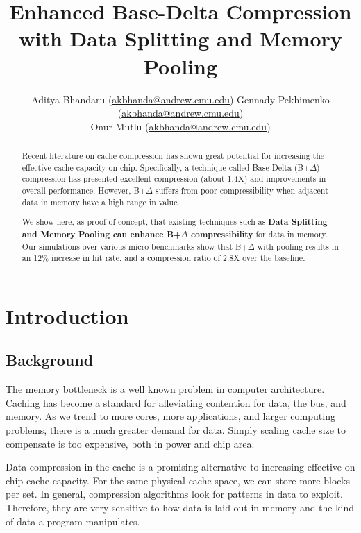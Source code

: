 \documentclass[pageno]{jpaper}
\begin{document}
\title{Enhanced Base-Delta Compression with Data Splitting and Memory Pooling}
\author{Aditya Bhandaru (\href{mailto:akbhanda@andrew.cmu.edu}{akbhanda@andrew.cmu.edu}) Gennady Pekhimenko (\href{mailto:gpekhime@cs.cmu.edu}{akbhanda@andrew.cmu.edu}) \\
Onur Mutlu (\href{mailto:onur@cmu.edu}{akbhanda@andrew.cmu.edu})}
\date{}
\maketitle

\thispagestyle{empty}

\begin{abstract}
Recent literature on cache compression has shown great potential for increasing the effective cache capacity on chip. Specifically, a technique called Base-Delta (B+$\Delta$) compression has presented excellent compression (about 1.4X) and improvements in overall performance. However, B+$\Delta$ suffers from poor compressibility when adjacent data in memory have a high range in value.

We show here, as proof of concept, that existing techniques such as \textbf{Data Splitting and Memory Pooling can enhance B+$\Delta$ compressibility} for data in memory. Our simulations over various micro-benchmarks show that B+$\Delta$ with pooling  results in an 12\% increase in hit rate, and a compression ratio of 2.8X over the baseline.
\end{abstract}

\section{Introduction}

\subsection{Background}

The memory bottleneck is a well known problem in computer architecture. Caching has become a standard for alleviating contention for data, the bus, and memory. As we trend to more cores, more applications, and larger computing problems, there is a much greater demand for data. Simply scaling cache size to compensate is too expensive, both in power and chip area.

Data compression in the cache is a promising alternative to increasing effective on chip cache capacity. For the same physical cache space, we can store more blocks per set. In general, compression algorithms look for patterns in data to exploit. Therefore, they are very sensitive to how data is laid out in memory and the kind of data a program manipulates.
\end{document}
